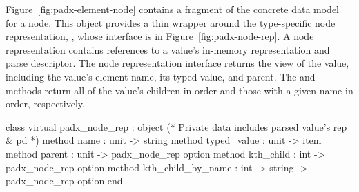 Figure~\ref{fig:padx-element-node} contains a fragment of the \padx{}
concrete data model for a node.  This object provides a thin wrapper
around the type-specific node representation, ,
whose interface is in Figure~\ref{fig:padx-node-rep}.  A node
representation contains references to a \pads{} value's in-memory
representation and parse descriptor.  The node representation
interface returns the \Xml{} view of the \pads{} value, including the
value's element name, its typed value, and parent.
The  and  methods 
return all of the \pads{} value's children in order and those with a
given name in order, respectively.
\begin{figure*}
\begin{small}
\begin{code}
class virtual padx\_node\_rep :
  object 
    (* Private data includes parsed value's rep \& pd *)
    method name        : unit -> string
    method typed_value : unit -> item
    method parent      : unit -> padx\_node\_rep option
    method kth\_child   : int -> padx\_node\_rep option
    method kth\_child\_by\_name : int -> string -> padx\_node\_rep option
  end
\end{code}
\end{small}
\caption{The \padx{} node representation}
\label{fig:padx-node-rep}
\end{figure*}

